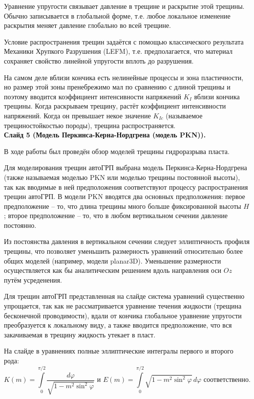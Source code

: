 \documentclass[a4paper, 12pt]{article}
\begin{document}
Уравнение упругости связывает давление в трещине и раскрытие этой трещины.
Обычно записывается в глобальной форме, т.е. любое локальное изменение раскрытия меняет давление глобально во всей трещине.

Условие распространения трещин задаётся с помощью классического результата Механики Хрупкого Разрушения (LEFM), т.е. предполагается, что материал сохраняет свойство линейной упругости вплоть до разрушения.

На самом деле вблизи кончика есть нелинейные процессы и зона пластичности, но размер этой зоны пренебрежимо мал по сравнению с длиной трещины и поэтому вводится коэффициент интенсивности напряжений $K_I$ вблизи кончика трещины.
Когда раскрываем трещину, растёт коэффициент интенсивности напряжений.
Когда он превышает некое значение $K_{Ic}$ (называемое трещиностойкостью породы), трещина распространяется.
\\


\textbf{Слайд 5 (Модель Перкинса-Керна-Нордгрена (модель PKN)).}

В ходе работы был проведён обзор моделей трещины гидроразрыва пласта.

Для моделирования трещин автоГРП выбрана модель Перкинса-Керна-Нордгрена (также называемая моделью PKN или моделью трещины постоянной высоты), так как вводимые в ней предположения соответствуют процессу распространения трещин автоГРП.
В модели PKN вводятся два основных предположения: первое предположение -- то, что длина трещины много больше фиксированной высоты $H$; второе предположение -- то, что в любом вертикальном сечении давление постоянно.

Из постоянства давления в вертикальном сечении следует эллиптичность профиля трещины, что позволяет уменьшить размерность уравнений относительно более общих моделей (например, модели planar3D).
Уменьшение размерности осуществляется как бы аналитическим решением вдоль направления оси $Oz$ путём усреденения.

Для трещин автоГРП представленная на слайде система уравнений существенно упрощается, так как не рассматривается уравнение течения жидкости (трещина бесконечной проводимости), вдали от кончика глобальное уравнение упругости преобразуется к локальному виду, а также вводится предположение, что вся закачиваемая в трещину жидкость утекает в пласт.

На слайде в уравнениях полные эллиптические интегралы первого и второго рода:
$$K(m)=\int\limits_{0}^{\pi/2}{\frac{d\varphi}{\sqrt{1-m^2\sin^2{\!\varphi}}}}\text{ и } E(m)=\int\limits_{0}^{\pi/2}{\sqrt{1-m^2\sin^2{\!\varphi}}\,d\varphi}\text{ соответственно.}$$
\\
\end{document}
